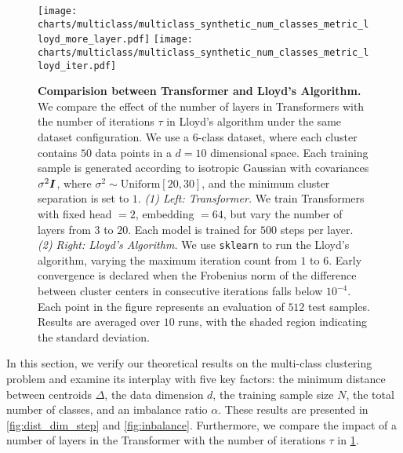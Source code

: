 \begin{figure}[!h]
        \texttt{[image: charts/multiclass/multiclass\_synthetic\_num\_classes\_metric\_lloyd\_more\_layer.pdf]}
    \endminipage\hfill
        \texttt{[image: charts/multiclass/multiclass\_synthetic\_num\_classes\_metric\_lloyd\_iter.pdf]}
    \endminipage\hfill
\endminipage
\vspace{-1em}
\caption{\textbf{Comparision between Transformer and Lloyd's Algorithm.}
We compare the effect of the number of layers in Transformers with the number of iterations $\tau$ in Lloyd's algorithm under the same dataset configuration.  
We use a $6$-class dataset, where each cluster contains $50$ data points in a $d=10$ dimensional space.  
Each training sample is generated according to isotropic Gaussian with covariances $\sigma^2 \boldsymbol{I}$, where $\sigma^2 \sim \mathrm{Uniform}[20,30]$, and the minimum cluster separation is set to $1$.  
\emph{(1) Left: Transformer.} 
We train Transformers with fixed head $=2$, embedding $= 64$, but vary the number of layers from $3$ to $20$.
Each model is trained for $500$ steps per layer.  
\emph{(2) Right: Lloyd's Algorithm.}
We use \texttt{sklearn}\citep{pedregosa2011scikit} to run the Lloyd's algorithm, varying the maximum iteration count from $1$ to $6$.  
Early convergence is declared when the Frobenius norm of the difference between cluster centers in consecutive iterations falls below $10^{-4}$. 
Each point in the figure represents an evaluation of $512$ test samples.  
Results are averaged over $10$ runs, with the shaded region indicating the standard deviation.}
\label{fig:com_lloyd}
\end{figure}

In this section, we verify our theoretical results on the multi-class clustering problem and examine its interplay with five key factors: the minimum distance between centroids $\Delta$, the data dimension $d$, the training sample size $N$, the total number of classes, and an imbalance ratio $\alpha$. These results are presented in  \cref{fig:dist_dim_step} and \cref{fig:inbalance}.
Furthermore, we compare the impact of a number of layers in the Transformer with the number of iterations $\tau$ in \cref{fig:com_lloyd}.

